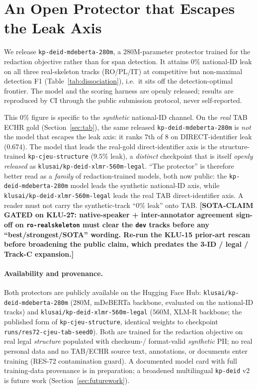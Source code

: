\documentclass[11pt]{article}
\newcommand{\sotagate}{\textbf{[SOTA-CLAIM GATED on KLU-27: native-speaker + inter-annotator
agreement sign-off on \texttt{ro-realskeleton} must clear the \texttt{dev} tracks before any
``best/strongest/SOTA'' wording. Re-run the KLU-15 prior-art rescan before broadening the public
claim, which predates the 3-ID / legal / Track-C expansion.]}}
\begin{document}
\section{An Open Protector that Escapes the Leak Axis}
\label{sec:protector}
We release \texttt{kp-deid-mdeberta-280m}, a $280$M-parameter protector trained for the redaction
objective rather than for span detection. It attains $0\%$ national-ID leak on all three
real-skeleton tracks (RO/PL/IT) at competitive but non-maximal detection F1 (Table~\ref{tab:dissociation}),
i.e.\ it sits off the detection-optimal frontier. The model and the scoring harness are openly
released; results are reproduced by CI through the public submission protocol, never self-reported.

This $0\%$ figure is specific to the \emph{synthetic} national-ID channel. On the \emph{real} TAB
ECHR gold (Section~\ref{sec:tab}), the same released \texttt{kp-deid-mdeberta-280m} is \emph{not} the
model that escapes the leak axis: it ranks $7$th of $8$ on DIRECT-identifier leak ($0.674$). The
model that leads the real-gold direct-identifier axis is the structure-trained
\texttt{kp-cjeu-structure} ($9.5\%$ leak), a \emph{distinct} checkpoint that is itself \emph{openly
released} as \texttt{klusai/kp-deid-xlmr-560m-legal}. ``The protector'' is therefore better read as a
\emph{family} of redaction-trained models, both now public: the \texttt{kp-deid-mdeberta-280m} model
leads the synthetic national-ID axis, while \texttt{klusai/kp-deid-xlmr-560m-legal} leads the real TAB
direct-identifier axis. A reader must
not carry the synthetic-track ``$0\%$ leak'' onto TAB. \sotagate{}

\paragraph{Availability and provenance.}
Both protectors are publicly available on the Hugging Face Hub:
\texttt{klusai/kp-deid-mdeberta-280m} ($280$M, mDeBERTa backbone, evaluated on the national-ID tracks)
and \texttt{klusai/kp-deid-xlmr-560m-legal} ($560$M, XLM-R backbone; the published form of
\texttt{kp-cjeu-structure}, identical weights to checkpoint \texttt{runs/res72-cjeu-tab-seed0}). Both
are trained for the redaction objective on real legal \emph{structure} populated with checksum-/
format-valid \emph{synthetic} PII; no real personal data and no TAB/ECHR source text, annotations, or
documents enter training (RES-72 contamination guard). A documented model card with full training-data
provenance is in preparation; a broadened multilingual \texttt{kp-deid} v2 is future work
(Section~\ref{sec:futurework}).
\end{document}
